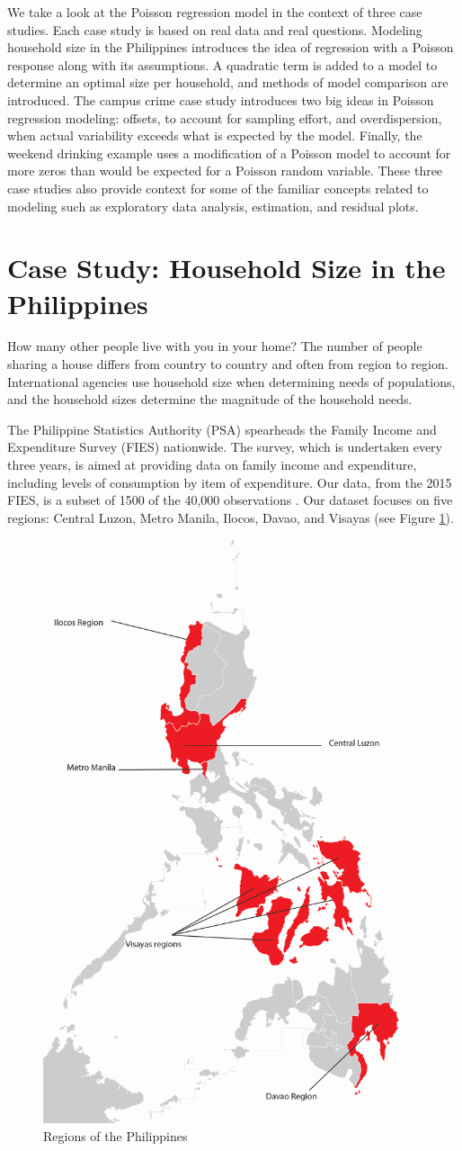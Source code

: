 \documentclass[
]{krantz}
\begin{document}
We take a look at the Poisson regression model in the context of three case studies. Each case study is based on real data and real questions. Modeling household size in the Philippines introduces the idea of regression with a Poisson response along with its assumptions. A quadratic term is added to a model to determine an optimal size per household, and methods of model comparison are introduced. The campus crime case study introduces two big ideas in Poisson regression modeling: offsets, to account for sampling effort, and overdispersion, when actual variability exceeds what is expected by the model. Finally, the weekend drinking example uses a modification of a Poisson model to account for more zeros than would be expected for a Poisson random variable. These three case studies also provide context for some of the familiar concepts related to modeling such as exploratory data analysis, estimation, and residual plots.

\hypertarget{cs-philippines}{%
\section{Case Study: Household Size in the Philippines}\label{cs-philippines}}

How many other people live with you in your home? The number of people sharing a house differs from country to country and often from region to region. International agencies use household size when determining needs of populations, and the household sizes determine the magnitude of the household needs.

The Philippine Statistics Authority (PSA) spearheads the Family Income and Expenditure Survey (FIES) nationwide. The survey, which is undertaken every three years, is aimed at providing data on family income and expenditure, including levels of consumption by item of expenditure. Our data, from the 2015 FIES, is a subset of 1500 of the 40,000 observations \citep{PSA}. Our dataset focuses on five regions: Central Luzon, Metro Manila, Ilocos, Davao, and Visayas (see Figure \ref{fig:philippinesmap}).

\begin{figure}
\includegraphics[width=0.5\linewidth]{data/map_of_philippines} \caption{Regions of the Philippines}\label{fig:philippinesmap}
\end{figure}
\end{document}
